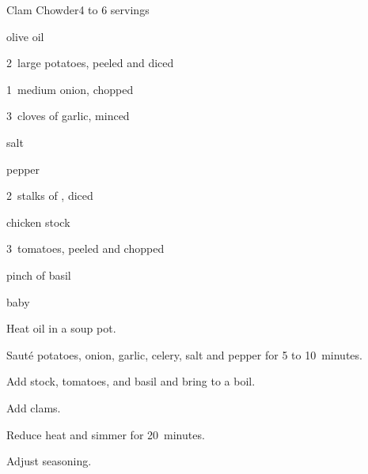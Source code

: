 \begin{recipe}{Clam Chowder}{}{4 to 6 servings}

\begin{ingredients}
\item {} olive oil
\item 2~large potatoes, peeled and diced
\item 1~medium onion, chopped
\item 3~cloves of garlic, minced
\item salt
\item pepper
\item 2~stalks of , diced
\item {} chicken stock
\item 3~tomatoes, peeled and chopped
\item pinch of basil
\item {} baby 
\end{ingredients}

\begin{directions}
\item Heat oil in a soup pot.
\item Saut\'e potatoes, onion, garlic, celery, salt and pepper for 5 to 10~minutes.
\item Add stock, tomatoes, and basil and bring to a boil.
\item Add clams.
\item Reduce heat and simmer for 20~minutes.
\item Adjust seasoning.
\end{directions}

\end{recipe}
